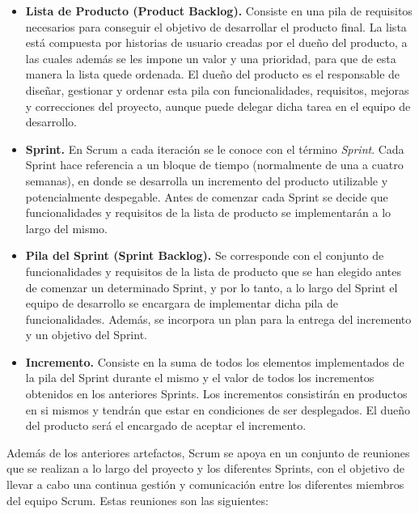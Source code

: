 \begin{itemize}
	\item \textbf{Lista de Producto (Product Backlog).} Consiste en una pila de requisitos necesarios para conseguir el objetivo de desarrollar el producto final. La lista está compuesta por historias de usuario creadas por el dueño del producto, a las cuales además se les impone un valor y una prioridad, para que de esta manera la lista quede ordenada. El dueño del producto es el responsable de diseñar, gestionar y ordenar esta pila con funcionalidades, requisitos, mejoras y correcciones del proyecto, aunque puede delegar dicha tarea en el equipo de desarrollo.
	\item \textbf{Sprint.} En Scrum a cada iteración se le conoce con el término \emph{Sprint}. Cada Sprint hace referencia a un bloque de tiempo (normalmente de una a cuatro semanas), en donde se desarrolla un incremento del producto utilizable y potencialmente despegable. Antes de comenzar cada Sprint se decide que funcionalidades y requisitos de la lista de producto se implementarán a lo largo del mismo. 
	\item \textbf{Pila del Sprint (Sprint Backlog).} Se corresponde con el conjunto de funcionalidades y requisitos de la lista de producto que se han elegido antes de comenzar un determinado Sprint, y por lo tanto, a lo largo del Sprint el equipo de desarrollo se encargara de implementar dicha pila de funcionalidades. Además, se incorpora un plan para la entrega del incremento y un objetivo del Sprint.
	\item \textbf{Incremento.} Consiste en la suma de todos los elementos implementados de la pila del Sprint durante el mismo y el valor de todos los incrementos obtenidos en los anteriores Sprints. Los incrementos consistirán en productos en si mismos y tendrán que estar en condiciones de ser desplegados. El dueño del producto será el encargado de aceptar el incremento.
\end{itemize}

Además de los anteriores artefactos, Scrum se apoya en un conjunto de reuniones que se realizan a lo largo del proyecto y los diferentes Sprints, con el objetivo de llevar a cabo una continua gestión y comunicación entre los diferentes miembros del equipo Scrum. Estas reuniones son las siguientes:


